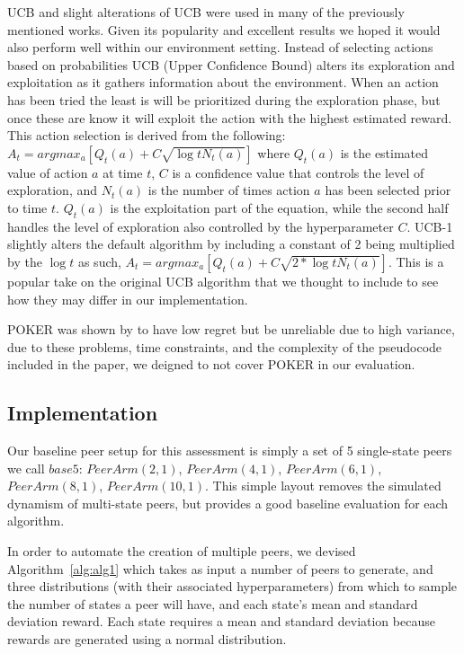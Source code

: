 \documentclass{article}
\begin{document}

UCB and slight alterations of UCB were used in many of the previously mentioned works. Given its popularity and excellent results we hoped it would also perform well within 
our environment setting. Instead of selecting actions based on probabilities UCB (Upper Confidence Bound) alters its exploration and exploitation as it gathers information 
about the environment. When an action has been tried the least is will be prioritized during the exploration phase, but once these are know it will exploit the 
action with the highest estimated reward. This action selection is derived from the following: $A_t = argmax_a \left[Q_t(a) + C \sqrt{\log{t} N_t(a)}\right]$ where 
$Q_t(a)$ is the estimated value of action $a$ at time $t$, $C$ is a confidence value that controls the level of exploration, and $N_t(a)$ is the number of times 
action $a$ has been selected prior to time $t$. $Q_t(a)$ is the exploitation part of the equation, while the second half handles the level of exploration also controlled by
the hyperparameter $C$. UCB-1 slightly alters the default algorithm by including a constant of 2 being multiplied by the $\log{t}$ as such, $A_t = argmax_a 
\left[Q_t(a) + C \sqrt{2*\log{t} N_t(a)}\right]$. This is a popular take on the original UCB algorithm that we thought to include to see how they may differ in our implementation. 

POKER was shown by \cite{muMAB_wireless} to have low regret but be unreliable due to high variance, due to these problems, time constraints, and the complexity of the 
pseudocode included in the paper, we deigned to not cover POKER in our evaluation.


\subsection{Implementation}
Our baseline peer setup for this assessment is simply a set of 5 single-state peers we call $base5$: $PeerArm(2,1)$, $PeerArm(4,1)$, $PeerArm(6,1)$, $PeerArm(8,1)$, 
$PeerArm(10,1)$. This simple layout removes the simulated dynamism of multi-state peers, but provides a good baseline evaluation for each algorithm. 

In order to automate the creation of multiple peers, we devised Algorithm~\ref{alg:alg1} which takes as input a number of peers to generate, and three distributions (with 
their associated hyperparameters) from which to sample the number of states a peer will have, and each state's mean and standard deviation reward. Each state requires a 
mean and standard deviation because rewards are generated using a normal distribution. 
\end{document}
